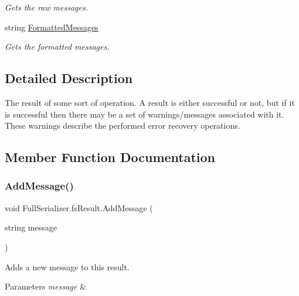\begin{DoxyCompactItemize}
\begin{DoxyCompactList}\small\item\em Gets the raw messages. \end{DoxyCompactList}\item 
string \hyperlink{struct_full_serializer_1_1fs_result_a4930e1ef04bc46c9b31b324bb130e251}{Formatted\+Messages}
\begin{DoxyCompactList}\small\item\em Gets the formatted messages. \end{DoxyCompactList}\end{DoxyCompactItemize}


\subsection{Detailed Description}
The result of some sort of operation. A result is either successful or not, but if it is successful then there may be a set of warnings/messages associated with it. These warnings describe the performed error recovery operations. 



\subsection{Member Function Documentation}
\mbox{\label{struct_full_serializer_1_1fs_result_afe5ac00b5b1c6b4863a4a7870cbbd066}} 
\subsubsection{\texorpdfstring{Add\+Message()}{AddMessage()}}
{\footnotesize\ttfamily void Full\+Serializer.\+fs\+Result.\+Add\+Message (\begin{DoxyParamCaption}\item[{string}]{message }\end{DoxyParamCaption})\hspace{0.3cm}{\ttfamily [inline]}}



Adds a new message to this result. 


\begin{DoxyParams}{Parameters}
{\em message} & \\
\hline
\end{DoxyParams}
\mbox{\label{struct_full_serializer_1_1fs_result_a7aff2b2f78db0d8e0b9e0daeb08a8f70}} 
